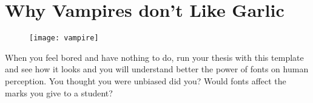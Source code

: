 \chapter{Why Vampires don’t Like Garlic}
\begin{figure}[ht]
\centering
\texttt{[image: vampire]}
\end{figure}

When you feel bored and have nothing to do, run your thesis with this template and see how it looks and you will understand better the power of fonts on human perception. You thought you were unbiased did you? Would fonts affect the marks you give to a student?

















\makeatother
